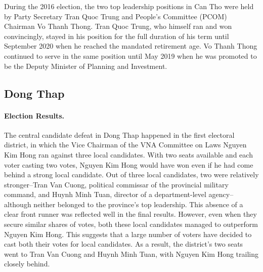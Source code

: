 \documentclass[12pt]{article}
\newcommand{\1}{\mathbbm{1}}
\begin{document}
During the 2016 election, the two top leadership positions in Can Tho were held by Party Secretary Tran Quoc Trung and People's Committee (PCOM) Chairman Vo Thanh Thong. Tran Quoc Trung, who himself ran and won convincingly, stayed in his position for the full duration of his term until September 2020 when he reached the mandated retirement age. Vo Thanh Thong continued to serve in the same position until May 2019 when he was promoted to be the Deputy Minister of Planning and Investment.

\subsection{Dong Thap}

\paragraph{Election Results.} 

The central candidate defeat in Dong Thap happened in the first electoral district, in which the Vice Chairman of the VNA Committee on Laws Nguyen Kim Hong ran against three local candidates. With two seats available and each voter casting two votes, Nguyen Kim Hong would have won even if he had come behind a strong local candidate. Out of three local candidates, two were relatively stronger--Tran Van Cuong, political commissar of the provincial military command, and Huynh Minh Tuan, director of a department-level agency--although neither belonged to the province's top leadership. This absence of a clear front runner was reflected well in the final results. However, even when they secure similar shares of votes, both these local candidates managed to outperform Nguyen Kim Hong. This suggests that a large number of voters have decided to cast both their votes for local candidates. As a result, the district's two seats went to Tran Van Cuong and Huynh Minh Tuan, with Nguyen Kim Hong trailing closely behind.
\end{document}

